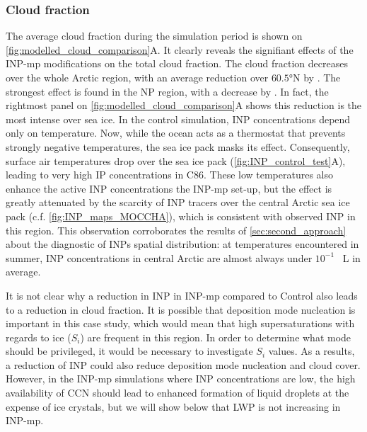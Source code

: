     \subsubsection{Cloud fraction}
    The average cloud fraction during the simulation period is shown on \cref{fig:modelled_cloud_comparison}A. It clearly reveals the signifiant effects of the INP-mp modifications on the total cloud fraction. The cloud fraction decreases over the whole Arctic region, with an average reduction over $60.5$°N by .
    The strongest effect is found in the NP region, with a decrease by .
    In fact, the rightmost panel on  \cref{fig:modelled_cloud_comparison}A shows this reduction is the most intense over sea ice.
    In the control simulation, INP concentrations depend only on temperature. Now, while the ocean acts as a thermostat that prevents strongly negative temperatures, the sea ice pack masks its effect. 
    Consequently, surface air temperatures drop over the sea ice pack (\cref{fig:INP_control_test}A), leading to very high IP concentrations in C86.
    These low temperatures also enhance the active INP concentrations the INP-mp set-up, but the effect is greatly attenuated by the scarcity of INP tracers over the central Arctic sea ice pack (c.f. \cref{fig:INP_maps_MOCCHA}), which is consistent with observed INP in this region.
    This observation corroborates the results of \cref{sec:second_approach} about the diagnostic of INPs spatial distribution: at temperatures encountered in summer, INP concentrations in central Arctic are almost always under $10^{-1}$ \si{\per\liter} in average. 
    
    It is not clear why a reduction in INP in INP-mp compared to Control also leads to a reduction in cloud fraction. 
    It is possible that deposition mode nucleation is important in this case study, which would mean that high supersaturations with regards to ice ($S_i$) are frequent in this region.
    In order to determine what mode should be privileged, it would be necessary to investigate $S_i$ values.  
    As a results, a reduction of INP could also reduce deposition mode nucleation and cloud cover. However, in the INP-mp simulations where INP concentrations are low, the high availability of CCN should lead to enhanced formation of liquid droplets at the expense of ice crystals, but we will show below that LWP is not increasing in INP-mp.
    \vspace{\baselineskip}

